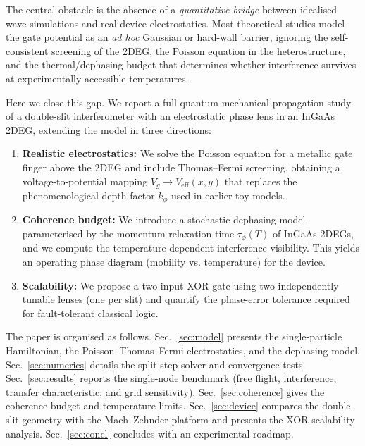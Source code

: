 \documentclass[11pt,a4paper]{article}
\begin{document}
The central obstacle is the absence of a \emph{quantitative bridge} between 
idealised wave simulations and real device electrostatics. Most theoretical 
studies model the gate potential as an \emph{ad hoc} Gaussian or hard-wall 
barrier, ignoring the self-consistent screening of the 2DEG, the Poisson 
equation in the heterostructure, and the thermal/dephasing budget that 
determines whether interference survives at experimentally accessible 
temperatures.

Here we close this gap. We report a full quantum-mechanical propagation study 
of a double-slit interferometer with an electrostatic phase lens in an InGaAs 
2DEG, extending the model in three directions:
\begin{enumerate}
  \item \textbf{Realistic electrostatics:} We solve the Poisson equation for 
  a metallic gate finger above the 2DEG and include Thomas--Fermi screening, 
  obtaining a voltage-to-potential mapping $V_g\to V_{\text{eff}}(x,y)$ that 
  replaces the phenomenological depth factor $k_\phi$ used in earlier toy 
  models.
  \item \textbf{Coherence budget:} We introduce a stochastic dephasing model 
  parameterised by the momentum-relaxation time $\tau_\phi(T)$ of InGaAs 2DEGs, 
  and we compute the temperature-dependent interference visibility. This yields 
  an operating phase diagram (mobility vs. temperature) for the device.
  \item \textbf{Scalability:} We propose a two-input XOR gate using two 
  independently tunable lenses (one per slit) and quantify the phase-error 
  tolerance required for fault-tolerant classical logic.
\end{enumerate}

The paper is organised as follows. Sec.~\ref{sec:model} presents the 
single-particle Hamiltonian, the Poisson--Thomas--Fermi electrostatics, and 
the dephasing model. Sec.~\ref{sec:numerics} details the split-step solver 
and convergence tests. Sec.~\ref{sec:results} reports the single-node 
benchmark (free flight, interference, transfer characteristic, and grid 
sensitivity). Sec.~\ref{sec:coherence} gives the coherence budget and 
temperature limits. Sec.~\ref{sec:device} compares the double-slit geometry 
with the Mach--Zehnder platform and presents the XOR scalability analysis. 
Sec.~\ref{sec:concl} concludes with an experimental roadmap.
\end{document}
